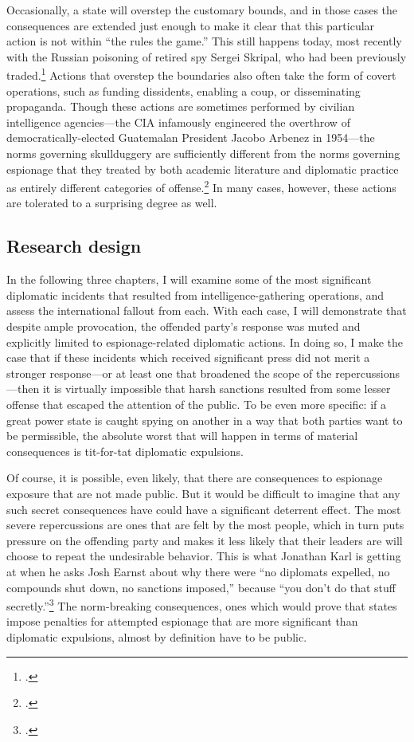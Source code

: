 \documentclass{report}
\begin{document}
\begin{refsegment}
Occasionally, a state will overstep the customary bounds, and in those cases the consequences are extended just enough to make it clear that this particular action is not within ``the rules the game.'' This still happens today, most recently with the Russian poisoning of retired spy Sergei Skripal, who had been previously traded.\footcite{masters_has_2018} Actions that overstep the boundaries also often take the form of covert operations, such as funding dissidents, enabling a coup, or disseminating propaganda. Though these actions are sometimes performed by civilian intelligence agencies---the CIA infamously engineered the overthrow of democratically-elected Guatemalan President Jacobo Arbenez in 1954---the norms governing skullduggery are sufficiently different from the norms governing espionage that they treated by both academic literature and diplomatic practice as entirely different categories of offense.\footcite{fraser_architecture_2005} In many cases, however, these actions are tolerated to a surprising degree as well.

\subsection{Research design}
In the following three chapters, I will examine some of the most significant diplomatic incidents that resulted from intelligence-gathering operations, and assess the international fallout from each. With each case, I will demonstrate that despite ample provocation, the offended party's response was muted and explicitly limited to espionage-related diplomatic actions. In doing so, I make the case that if these incidents which received significant press did not merit a stronger response---or at least one that broadened the scope of the repercussions---then it is virtually impossible that harsh sanctions resulted from some lesser offense that escaped the attention of the public. To be even more specific: if a great power state is caught spying on another in a way that both parties want to be permissible, the absolute worst that will happen in terms of material consequences is tit-for-tat diplomatic expulsions.

Of course, it is possible, even likely, that there are consequences to espionage exposure that are not made public. But it would be difficult to imagine that any such secret consequences have could have a significant deterrent effect.  The most severe repercussions are ones that are felt by the most people, which in turn puts pressure on the offending party and makes it less likely that their leaders are will choose to repeat the undesirable behavior. This is what Jonathan Karl is getting at when he asks Josh Earnst about why there were ``no diplomats expelled, no compounds shut down, no sanctions imposed,'' because ``you don't do that stuff secretly.''\footcite{earnest_press_2017} The norm-breaking consequences, ones which would prove that states impose penalties for attempted espionage that are more significant than diplomatic expulsions, almost by definition have to be public.


\end{refsegment}
\end{document}
